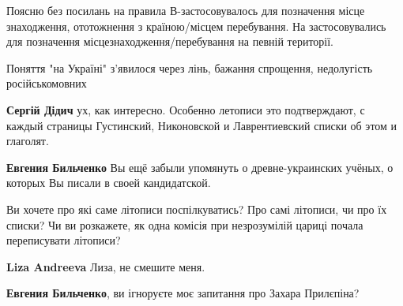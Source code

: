 \begin{itemize}
\begin{itemize}
Поясню без посилань на правила В-застосовувалось для позначення місце
знаходження, ототожнення з країною/місцем перебування. На застосовувались для
позначення місцезнаходження/перебування на певній території.

Поняття "на Україні" з'явилося через лінь, бажання спрощення, недолугість
російськомовних


 
\textbf{Сергій Дідич} ух, как интересно. Особенно летописи это подтверждают, с
каждый страницы Густинский, Никоновской и Лаврентиевский списки об этом и
глаголят.

 
\textbf{Евгения Бильченко} Вы ещё забыли упомянуть о древне-украинских учёных, о которых Вы писали в своей кандидатской.

 

Ви хочете про які саме літописи поспілкуватись? Про самі літописи, чи про їх
списки? Чи ви розкажете, як одна комісія при незрозумілій цариці почала
переписувати літописи?

 
\textbf{Liza Andreeva} Лиза, не смешите меня.

 
\textbf{Евгения Бильченко}, ви ігноруєте моє запитання про Захара Прилєпіна?


\end{itemize}
\end{itemize}

